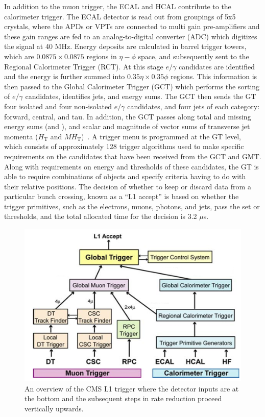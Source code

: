 In addition to the muon trigger, the ECAL and HCAL contribute to the calorimeter trigger. The ECAL detector is read out from groupings of 5x5 crystals, where the APDs or VPTs are connected to multi gain pre-amplifiers and these gain ranges are fed to an analog-to-digital converter (ADC) which digitizes the signal at 40 MHz. Energy deposits are calculated in barrel trigger towers, which are $0.0875\times 0.0875$ regions in $\eta-\phi$ space, and subsequently sent to the Regional Calorimeter Trigger (RCT). At this stage $e/\gamma$ candidates are identified and the energy is further summed into $0.35\eta\times 0.35\phi$ regions. This information is then passed to the Global Calorimeter Trigger (GCT) which performs the sorting of $e/\gamma$ candidates, identifies jets, and energy sums. The GCT then sends the GT four isolated and four non-isolated $e/\gamma$ candidates, and four jets of each category: forward, central, and tau. In addition, the GCT passes along total and missing energy sums (\Et and \MET), and scalar and magnitude of vector sums of transverse jet momenta ($H_\mathrm{T}$ and $MH_\mathrm{T}$)~\cite{Brooke:2013hnf}. A trigger menu is programmed at the GT level, which consists of approximately 128 trigger algorithms used to make specific requirements on the candidates that have been received from the GCT and GMT. Along with requirements on energy and \pt thresholds of these candidates, the GT is able to require combinations of objects and specify criteria having to do with their relative positions. The decision of whether to keep or discard data from a particular bunch crossing, known as a ``L1 accept'' is based on whether the trigger primitives, such as the electrons, muons, photons, and jets, pass the set \Et or \pt thresholds, and the total allocated time for the decision is 3.2 $\mu$s. 

\begin{figure}
  \centering
  \includegraphics[width=\textwidth]{figs/trigger2}
  \caption{An overview of the CMS L1 trigger where the detector inputs are at the bottom and the subsequent steps in rate reduction proceed vertically upwards.~\cite{Halyo:2013iba}}
  \label{fig:L1T}
\end{figure}

